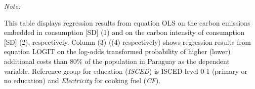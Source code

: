 \begin{table}[htbp!]
\begin{adjustbox}{width = 1\textwidth, max height = 0.95\textheight, center}
\begin{threeparttable}[b]
         \begin{tablenotes}\item \medskip \textit{Note:}
            \item This table displays regression results from equation OLS on the carbon emissions embedded in consumption [SD] (1) and on the carbon intensity of consumption [SD] (2), respectively. 
                                      Column (3) ((4) respectively) shows regression results from equation LOGIT on the log-odds transformed probability of higher (lower) additional costs than 80\% of the population in Paraguay as the dependent variable. Reference group for education (\textit{ISCED}) is ISCED-level 0-1 (primary or no education) and \textit{Electricity} for cooking fuel (\textit{CF}).
         \end{tablenotes}
      \end{threeparttable}
   \end{adjustbox}
\end{table}


